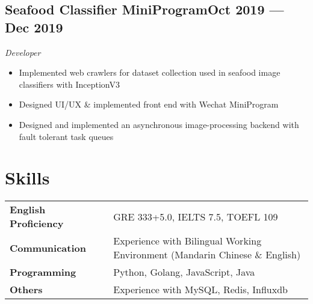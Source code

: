 \documentclass[a4,12pt]{article}
\newcommand{\subtext}[1]{
#1\par\vspace{-0.3cm}}
\newenvironment{zitemize}{
\begin{itemize}\itemsep0pt \parskip0pt \parsep1pt}
{\end{itemize}\vspace{-0.5cm}}
\newcommand{\hskills}[1]{
\textbf{\bfseries #1} }
\begin{document}
\subsection*{Seafood Classifier MiniProgram\hfill \textbf{Oct 2019 --- Dec 2019}}
\subtext{\textit{Developer}}
\begin{zitemize}
    \item Implemented web crawlers for dataset collection used in seafood image classifiers with InceptionV3
    \item Designed UI/UX \& implemented front end with Wechat MiniProgram
    \item Designed and implemented an asynchronous image-processing backend with fault tolerant task queues
\end{zitemize}




\section{\textbf{Skills}}
\begin{tabular}{p{11em} p{1em} p{43em}}
\hskills{English Proficiency} & & GRE 333+5.0, IELTS 7.5, TOEFL 109 \\
\hskills{Communication} & & Experience with Bilingual Working Environment (Mandarin Chinese \& English)  \\
\hskills{Programming} &  & Python, Golang, JavaScript, Java \\
\hskills{Others} & & Experience with MySQL, Redis, Influxdb
\end{tabular}
\vspace{-0.2cm}







\end{document}
